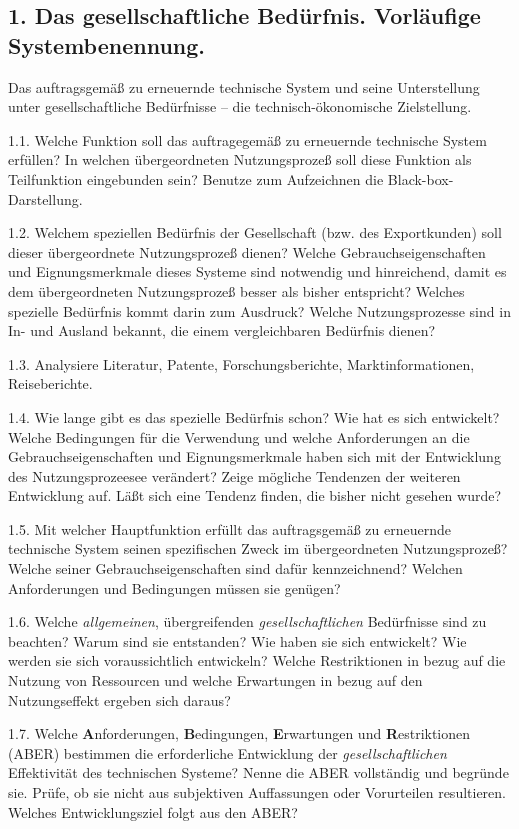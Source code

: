 \documentclass[11pt,a4paper]{article}
\begin{document}
\subsection*{1. Das gesellschaftliche Bedürfnis. Vorläufige Systembenennung.}

Das auftragsgemäß zu erneuernde technische System und seine Unterstellung
unter gesellschaftliche Bedürfnisse -- die technisch-ökonomische Zielstellung.

1.1. Welche Funktion soll das auftragegemäß zu erneuernde technische System
erfüllen? In welchen übergeordneten Nutzungsprozeß soll diese Funktion als
Teilfunktion eingebunden sein?  Benutze zum Aufzeichnen die
Black-box-Darstellung.

1.2. Welchem speziellen Bedürfnis der Gesellschaft (bzw. des Exportkunden)
soll dieser über\-geordnete Nutzungsprozeß dienen?  Welche
Gebrauchseigenschaften und Eignungsmerkmale dieses Systeme sind notwendig und
hinreichend, damit es dem übergeordneten Nutzungsprozeß besser als bisher
entspricht? Welches spezielle Bedürfnis kommt darin zum Ausdruck? Welche
Nutzungsprozesse sind in In- und Ausland bekannt, die einem vergleichbaren
Bedürfnis dienen?

1.3. Analysiere Literatur, Patente, Forschungsberichte, Marktinformationen,
Reiseberichte.

1.4. Wie lange gibt es das spezielle Bedürfnis schon? Wie hat es sich
entwickelt? Welche Bedingungen für die Verwendung und welche Anforderungen an
die Gebrauchseigenschaften und Eignungsmerkmale haben sich mit der Entwicklung
des Nutzungsprozeesee verändert? Zeige mögliche Tendenzen der weiteren
Entwicklung auf. Läßt sich eine Tendenz finden, die bisher nicht gesehen
wurde?

1.5. Mit welcher Hauptfunktion erfüllt das auftragsgemäß zu erneuernde
technische System seinen spezifischen Zweck im übergeordneten Nutzungsprozeß?
Welche seiner Gebrauchseigenschaften sind dafür kennzeichnend?  Welchen
Anforderungen und Bedingungen müssen sie genügen?

1.6. Welche \emph{allgemeinen}, übergreifenden \emph{gesellschaftlichen}
Bedürfnisse sind zu beachten?  Warum sind sie entstanden? Wie haben sie sich
entwickelt? Wie werden sie sich voraussichtlich entwickeln? Welche
Restriktionen in bezug auf die Nutzung von Ressourcen und welche Erwartungen
in bezug auf den Nutzungseffekt ergeben sich daraus?

1.7. Welche \textbf{A}nforderungen, \textbf{B}edingungen, \textbf{E}rwartungen
und \textbf{R}estriktionen (ABER) bestimmen die erforderliche Entwicklung der
\emph{gesellschaftlichen} Effektivität des technischen Systeme? Nenne die ABER
vollständig und begründe sie. Prüfe, ob sie nicht aus subjektiven Auffassungen
oder Vorurteilen resultieren.  Welches Entwicklungsziel folgt aus den ABER?
\end{document}
